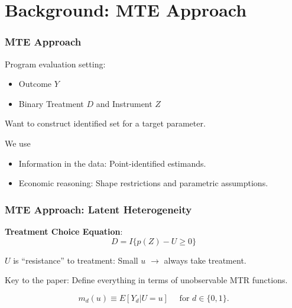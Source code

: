 \documentclass[11pt, aspectratio=169]{beamer}
\begin{document}
\begin{frame}
    \tableofcontents
\end{frame}

\section{Background: MTE Approach}

\begin{frame}
    \frametitle{MTE Approach}

    Program evaluation setting:
    \begin{itemize}
        \item Outcome $Y$
        \item Binary Treatment $D$ and Instrument $Z$
    \end{itemize}

    \vspace{0.5cm}

    Want to construct identified set for a target parameter.

    \vspace{0.5cm}
    We use
    \begin{itemize}
        \item Information in the data: Point-identified estimands.
        \item Economic reasoning: Shape restrictions and parametric assumptions.
    \end{itemize}

\end{frame}

\begin{frame}
    \frametitle{MTE Approach: Latent Heterogeneity}

    \textbf{Treatment Choice Equation}:
    \begin{equation}
        D = I\{p(Z) - U \geq 0\}
    \end{equation}

    \vspace{0.5cm}

    $U$ is ``resistance'' to treatment: Small $u$ $\rightarrow$ always take treatment.

    \vspace{0.5cm}

    Key to the paper: Define everything in terms of unobservable MTR functions.

    \begin{equation}
        m_d(u) \equiv E[Y_d | U=u] \quad \text{ for } d\in\{0, 1\}.
    \end{equation}

\end{frame}
\end{document}
